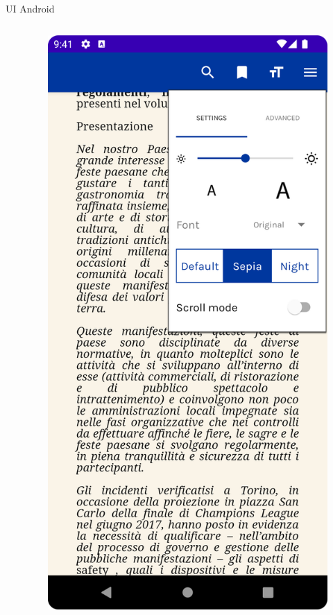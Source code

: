 \begin{frame}{UI Android}
\begin{columns}[onlytextwidth]
\begin{column}{0.24\textwidth}
        \end{column}
        \begin{column}{0.24\textwidth}
        
             \begin{figure}[H]
                \includegraphics[width=1\textwidth]{img/reader_settings.png}
            \end{figure}
            
        \end{column}
    \end{columns}
\end{frame}


